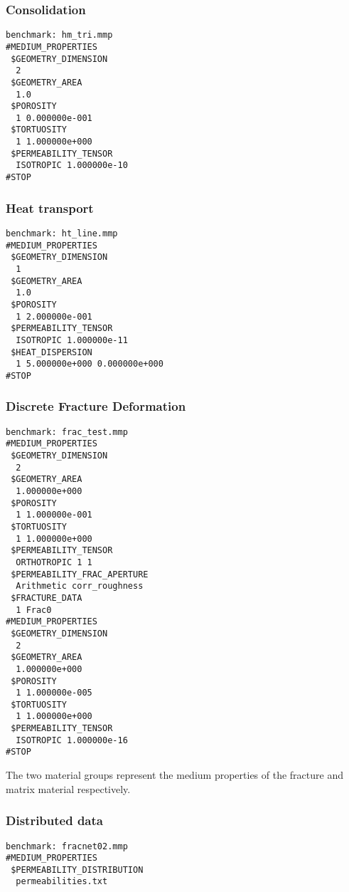 {%
\subsubsection{Consolidation}

\begin{verbatim}
benchmark: hm_tri.mmp
#MEDIUM_PROPERTIES
 $GEOMETRY_DIMENSION
  2
 $GEOMETRY_AREA
  1.0
 $POROSITY
  1 0.000000e-001
 $TORTUOSITY
  1 1.000000e+000
 $PERMEABILITY_TENSOR
  ISOTROPIC 1.000000e-10
#STOP
\end{verbatim}

\subsubsection{Heat transport}

\begin{verbatim}
benchmark: ht_line.mmp
#MEDIUM_PROPERTIES
 $GEOMETRY_DIMENSION
  1
 $GEOMETRY_AREA
  1.0
 $POROSITY
  1 2.000000e-001
 $PERMEABILITY_TENSOR
  ISOTROPIC 1.000000e-11
 $HEAT_DISPERSION
  1 5.000000e+000 0.000000e+000
#STOP

\end{verbatim}

\subsubsection{Discrete Fracture Deformation}

\begin{verbatim}
benchmark: frac_test.mmp
#MEDIUM_PROPERTIES
 $GEOMETRY_DIMENSION
  2
 $GEOMETRY_AREA
  1.000000e+000
 $POROSITY
  1 1.000000e-001
 $TORTUOSITY
  1 1.000000e+000
 $PERMEABILITY_TENSOR
  ORTHOTROPIC 1 1
 $PERMEABILITY_FRAC_APERTURE
  Arithmetic corr_roughness
 $FRACTURE_DATA
  1 Frac0
#MEDIUM_PROPERTIES
 $GEOMETRY_DIMENSION
  2
 $GEOMETRY_AREA
  1.000000e+000
 $POROSITY
  1 1.000000e-005
 $TORTUOSITY
  1 1.000000e+000
 $PERMEABILITY_TENSOR
  ISOTROPIC 1.000000e-16
#STOP

\end{verbatim}
The two material groups represent the medium properties of the fracture and matrix material respectively.  
\subsubsection{Distributed data}

\begin{verbatim}
benchmark: fracnet02.mmp
#MEDIUM_PROPERTIES
 $PERMEABILITY_DISTRIBUTION
  permeabilities.txt
\end{verbatim}


} %

